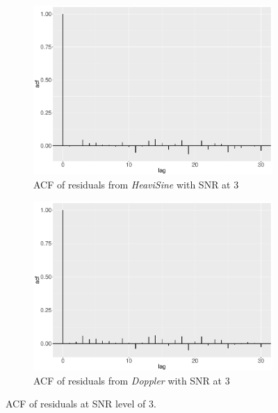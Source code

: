 \begin{figure}[!ht]
\begin{subfigure}{0.45\textwidth}
    \includegraphics[width=\textwidth]{Chapters/02TractorSplineTheory/plot/ggplot/ggacfHeavi3.pdf}
    \caption{ACF of residuals from \textit{HeaviSine} with SNR at 3 }
    \end{subfigure}
    \begin{subfigure}{0.45\textwidth}
    \centering
    \includegraphics[width=\textwidth]{Chapters/02TractorSplineTheory/plot/ggplot/ggacfDoppler3.pdf}
    \caption{ACF of residuals from \textit{Doppler} with SNR at 3 }
    \end{subfigure}
\caption{ACF of residuals at SNR level of 3.}\label{tractorsplineSNR3acf}
 \end{figure}

